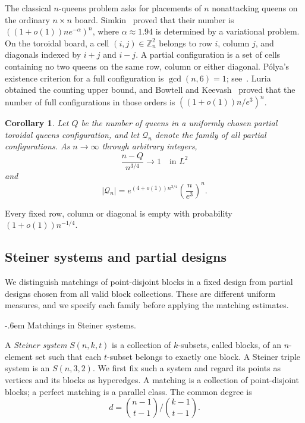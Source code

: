 \documentclass[11pt,reqno]{amsart}
\makeatletter
\numberwithin{equation}{section}
\renewcommand{\paragraph}{\@startsection{paragraph}{4}%
    \z@{.75\linespacing\@plus.2\linespacing\@minus.1\linespacing}%
    {-.6em}%
    {\normalfont\bfseries}}
\theoremstyle{plain}
\newtheorem{corollary}[theorem]{Corollary}
\theoremstyle{definition}
\newcommand{\calQ}{\mathcal{Q}}
\makeatother
\begin{document}
The classical $n$-queens problem asks for placements of $n$ nonattacking queens on the ordinary $n\times n$ board.
Simkin~\cite{Simkin} proved that their number is $((1+o(1))ne^{-\alpha})^n$, where $\alpha\approx1.94$ is determined by a variational problem.
On the toroidal board, a cell $(i,j)\in\mathbb Z_n^2$ belongs to row $i$, column $j$, and diagonals indexed by $i+j$ and $i-j$.
A partial configuration is a set of cells containing no two queens on the same row, column or either diagonal.
P\'olya's existence criterion for a full configuration is $\gcd(n,6)=1$; see~\cite{BK}.
Luria~\cite{Luria} obtained the counting upper bound, and Bowtell and Keevash~\cite{BK} proved that the number of full configurations in those orders is $((1+o(1))n/e^3)^n$.

\begin{corollary}\label{cor:queens}
    Let $Q$ be the number of queens in a uniformly chosen partial toroidal queens configuration, and let $\calQ_n$ denote the family of all partial configurations.
    As $n\to\infty$ through arbitrary integers,
    \[
        \frac{n-Q}{n^{3/4}} \to 1 \quad \text{in } L^2
    \]
    and
    \[
        |\calQ_n| = e^{(4 + o(1))n^{3/4}} \left( \frac{n}{e^3} \right)^n.
    \]
\end{corollary}

Every fixed row, column or diagonal is empty with probability $(1+o(1))n^{-1/4}$.


\subsection{Steiner systems and partial designs}\label{subsec:designapplications}

We distinguish matchings of point-disjoint blocks in a fixed design from partial designs chosen from all valid block collections.
These are different uniform measures, and we specify each family before applying the matching estimates.

\paragraph{Matchings in Steiner systems.}\label{subsec:steiner}

A \emph{Steiner system} $S(n,k,t)$ is a collection of $k$-subsets, called blocks, of an $n$-element set such that each $t$-subset belongs to exactly one block.
A Steiner triple system is an $S(n,3,2)$.
We first fix such a system and regard its points as vertices and its blocks as hyperedges.
A matching is a collection of point-disjoint blocks; a perfect matching is a parallel class.
The common degree is
\begin{equation}\label{eq:steiner-degree}
    d= \binom{n-1}{t-1}/\binom{k-1}{t-1}.
\end{equation}
\end{document}
